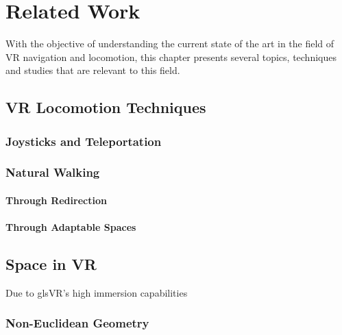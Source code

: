 
%
\glsresetall

\chapter{Related Work}
\label{cha:related_work}

With the objective of understanding the current state of the art in the field of \gls{VR} navigation and locomotion, this chapter presents several topics, techniques and studies that are relevant to this field.

\section{VR Locomotion Techniques}
\label{sec:vr-locomotion-techniques}

\subsection{Joysticks and Teleportation}
\label{sec:joysticks-and-teleportation}

\subsection{Natural Walking}
\label{sec:natural-walking}

\subsubsection{Through Redirection}
\label{sec:redirection}

\subsubsection{Through Adaptable Spaces}
\label{sec:adaptable-spaces} 

\section{Space in VR}
\label{sec:space-in-vr}

Due to gls{VR}'s high immersion capabilities

\subsection{Non-Euclidean Geometry}
\label{sec:non-euclidean-geometry}

